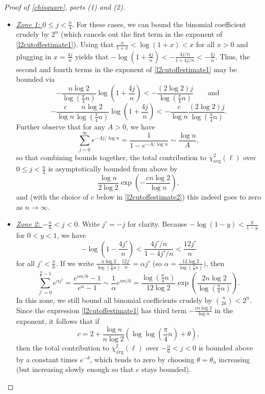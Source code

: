 \documentclass[11pt]{article}
\newcounter{r}
\newcounter{s}
\numberwithin{equation}{section}
\begin{document}
\begin{proof}[Proof of \cref{chisquare}, parts (1) and (2)]
\begin{itemize}
\item \textit{\underline{Zone 1: $0 \le j < \frac{n}{4}$}}. For these cases, we can bound the binomial coefficient crudely by $2^n$ (which cancels out the first term in the exponent of \cref{l2cutoffestimate1}). Using that $\frac{x}{1+x} < \log(1+x) < x$ for all $x > 0$ and plugging in $x = \frac{4j}{n}$ yields that $-\log\left(1 + \frac{4j}{n}\right) < -\frac{4j/n}{1 + 4j/n} < -\frac{2j}{n}$. Thus, the second and fourth terms in the exponent of \cref{l2cutoffestimate1} may be bounded via
\[
    -\frac{n \log 2}{\log\left(\frac{\pi}{4}n\right)}\log\left(1 + \frac{4j}{n}\right) < -\frac{(2 \log 2)j}{\log\left(\frac{\pi}{4} n\right)} \qquad \text{and }
\]
\[
    -\frac{c}{\log n}  \frac{n \log 2}{\log\left(\frac{\pi}{4}n\right)}\log\left(1 + \frac{4j}{n}\right) < -\frac{c}{\log n}  \frac{(2 \log 2)j}{\log\left(\frac{\pi}{4}n\right)}.
\]
Further observe that for any $A > 0$, we have
\[
    \sum_{j=0}^{\infty} e^{-Aj/\log n} = \frac{1}{1 -  e^{-A/\log n}} \sim \frac{\log n}{A},
\]
so that combining bounds together, the total contribution to $\overline{\chi}_{\text{avg}}^2(\ell)$ over $0 \le j < \frac{n}{4}$ is asymptotically bounded from above by
\[
    \frac{\log n}{2 \log 2} \exp\left(-\frac{cn \log 2}{\log n}\right),
\]
and (with the choice of $c$ below in \cref{l2cutoffestimate2}) this indeed goes to zero as $n \to \infty$.
\item \textit{\underline{Zone 2: $-\frac{n}{6} < j < 0$}}. Write $j' = -j$ for clarity. Because $-\log(1-y) < \frac{y}{1-y}$ for $0 < y < 1$, we have
\[
    -\log\left(1 - \frac{4j'}{n}\right) < \frac{4j'/n}{1 - 4j'/n} < \frac{12j'}{n}
\]
for all $j' < \frac{n}{6}$. If we write $\frac{n \log 2}{\log\left(\frac{\pi}{4} n\right)} \frac{12j'}{n} = \alpha j'$ (so $\alpha = \frac{12 \log 2}{\log\left(\frac{\pi}{4} n\right)})$, then
\[
    \sum_{j' = 0}^{\frac{n}{6} - 1} e^{\alpha j'} = \frac{e^{\alpha n/6} - 1}{e^{\alpha} - 1} \sim \frac{1}{\alpha}  e^{\alpha n/6} = \frac{\log\left(\frac{\pi}{4} n\right)}{12 \log 2} \exp\left(\frac{2n \log 2}{\log\left(\frac{\pi}{4} n\right)} \right).
\]
In this zone, we still bound all binomial coefficients crudely by $\binom{n}{2k} < 2^n$. Since the expression \cref{l2cutoffestimate1} has third term $-\frac{cn \log 2}{\log n}$ in the exponent, it follows that if
\begin{equation}\label{l2cutoffestimate2}
c = 2 + \frac{\log n}{n \log 2} \left(\log \log \left(\frac{\pi}{4} n\right) + \theta\right),
\end{equation}
then the total contribution to $\overline{\chi}_{\text{avg}}^2(\ell)$ over $-\frac{n}{6} < j < 0$ is bounded above by a constant times $e^{-\theta}$, which tends to zero by choosing $\theta = \theta_n$ increasing (but increasing slowly enough so that $c$ stays bounded).


\end{itemize}
\end{proof}
\end{document}
